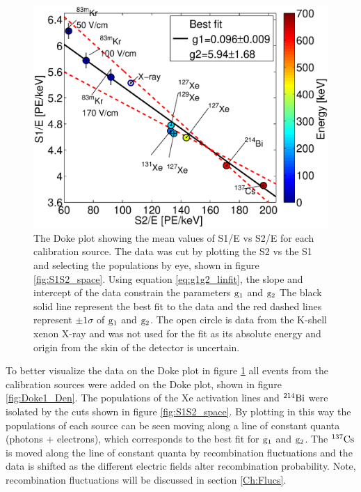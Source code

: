 \renewcommand{\baselinestretch}{1}
\small\normalsize
 \begin{figure}[h!]\centering
\includegraphics[width=130mm]{Chapter_E_Scale/Figures/Doke_new/S1S2_Doke_1.eps}
\caption{The Doke plot showing the mean values of S1/E vs S2/E for each calibration source. The data was cut by plotting the S2 vs the S1 and selecting the populations by eye, shown in figure \ref{fig:S1S2_space}. Using equation \ref {eq:g1g2_linfit}, the slope and intercept of the data constrain the parameters $\rm g_1$ and $\rm g_2$ The black solid line represent the best fit to the data and the red dashed lines represent $\pm 1\sigma$ of $\rm g_1$ and $\rm g_2$. The open circle is data from the K-shell xenon X-ray and was not used for the fit as its absolute energy and origin from the skin of the detector is uncertain.}
\label{fig:Doke1}
\end{figure}
\renewcommand{\baselinestretch}{2}
\small\normalsize
 
 \newpage
 
To better visualize the data on the Doke plot in figure \ref{fig:Doke1} all events from the calibration sources were added on the Doke plot, shown in figure \ref{fig:Doke1_Den}. The populations of the Xe activation lines and $\rm ^{214}Bi$ were isolated by the cuts shown in figure \ref{fig:S1S2_space}. By plotting in this way the populations of each source can be seen moving along a line of constant quanta (photons + electrons), which corresponds to the best fit for $\rm g_1$ and $\rm g_2$. The $\rm ^{137}Cs$ is moved along the line of constant quanta by recombination fluctuations and the \KrCal data is shifted as the different electric fields alter recombination probability. Note, recombination fluctuations will be discussed in section \ref{Ch:Flucs}. 

